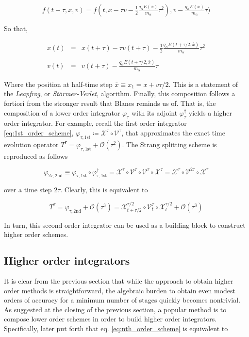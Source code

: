 \documentclass[11pt,titlepage]{report}
\begin{document}
 $$f(t+\tau , x, v) = f(t, x - \tau v - \tfrac{1}{2}\tfrac{q_{\alpha}E(\bar{x})}{m_{\alpha}}\tau^2), v - \tfrac{q_{\alpha} E(\bar{x})}{m_{\alpha}}\tau )$$

 \noindent So that,

\begin{eqnarray*}
x(t) & = & x(t + \tau ) - \tau v(t + \tau ) - \tfrac{1}{2}\frac{q_{\alpha}E(t + \tau /2, \bar{x})}{m_{\alpha}}\tau^2 \\
&& \\
v(t) & = & v(t + \tau ) - \frac{q_{\alpha} E(t + \tau / 2, \bar{x})}{m_{\alpha}}\tau
\end{eqnarray*}

\noindent Where the position at half-time step $\bar{x} \equiv x_1 = x + v\tau / 2$. This is a statement of the \emph{Leapfrog}, or \emph{St\"{o}rmer-Verlet}, algorithm. Finally, this composition follows a fortiori from the stronger result that Blanes \cite{Blanes02} reminds us of. That is, the composition of a lower order integrator $\varphi_{\tau}$ with its adjoint $\varphi_{\tau}^{\dagger}$ yields a higher order integrator. For example, recall the first order integrator \eqref{eq:1st_order_scheme}, $\varphi_{\tau ,\mathrm{1st}} \coloneqq \mathcal{X}^{\tau}\circ\mathcal{V}^{\tau}$, that approximates the exact time evolution operator $T^{\tau} = \varphi_{\tau ,\mathrm{1st}} + \mathcal{O}(\tau^2)$. The Strang splitting scheme is reproduced as follows

$$\varphi_{2\tau,\mathrm{2nd}} \equiv \varphi_{\tau ,\mathrm{1st}}\circ\varphi_{\tau ,\mathrm{1st}}^{\dagger} = \mathcal{X}^{\tau}\circ\mathcal{V}^{\tau}\circ\mathcal{V}^{\tau}\circ\mathcal{X}^{\tau} = \mathcal{X}^{\tau}\circ\mathcal{V}^{2\tau}\circ\mathcal{X}^{\tau}$$

\noindent over a time step $2\tau$. Clearly, this is equivalent to

$$T^{\tau} = \varphi_{\tau,\mathrm{2nd}} + \mathcal{O}(\tau^3) =  \mathcal{X}^{\tau /2}_{t + \tau /2}\circ\mathcal{V}^{\tau}_t\circ\mathcal{X}^{\tau / 2}_t + \mathcal{O}(\tau^3) $$

\noindent In turn, this second order integrator can be used as a building block to construct higher order schemes.

\subsection{Higher order integrators}

\indent\indent It is clear from the previous section that while the approach to obtain higher order methods is straightforward, the algebraic burden to obtain even modest orders of accuracy for a minimum number of stages quickly becomes nontrivial. As suggested at the closing of the previous section, a popular method is to compose lower order schemes in order to build higher order integrators. Specifically, \cite{Yoshida90} later put forth that eq. \eqref{eq:nth_order_scheme} is equivalent to
\end{document}
